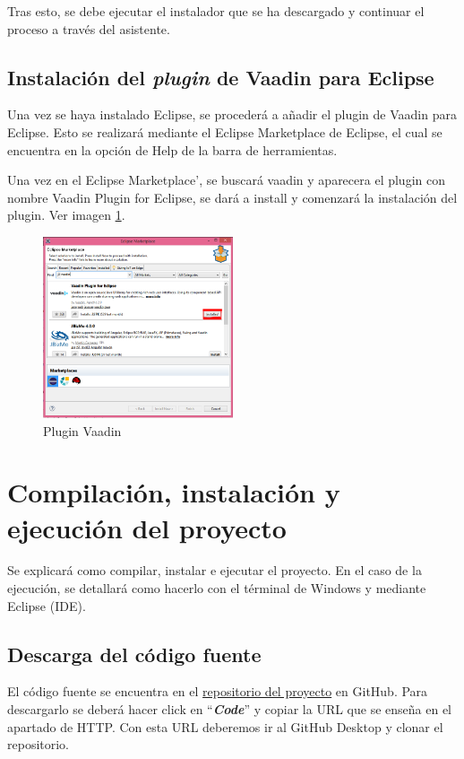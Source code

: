 Tras esto, se debe ejecutar el instalador que se ha descargado y continuar el proceso a través del asistente.

\subsection{Instalación del \textit{plugin} de Vaadin para Eclipse}
Una vez se haya instalado Eclipse, se procederá a añadir el plugin de Vaadin para Eclipse. 
Esto se realizará mediante el Eclipse Marketplace de Eclipse, el cual se encuentra en la opción de Help de la barra de herramientas. 

Una vez en el Eclipse Marketplace', se buscará vaadin y aparecera el plugin con nombre Vaadin Plugin for Eclipse, se dará a install y comenzará la instalación del plugin. Ver imagen \ref{img:Vaadin}.

\begin{figure}
\centering
\includegraphics[width=0.5\textwidth]{img/Plugin_Vaadin}
\caption{Plugin Vaadin}\label{img:Vaadin}
\end{figure}

\section{Compilación, instalación y ejecución del proyecto}
Se explicará como compilar, instalar e ejecutar el proyecto. En el caso de la ejecución, se detallará como hacerlo con el términal de Windows y mediante Eclipse (IDE).

\subsection{Descarga del código fuente}
El código fuente se encuentra en el \href{https://github.com/dbo1001/Gestor-TFG-2016}{repositorio del proyecto} en GitHub. Para descargarlo se deberá hacer click en ``\textbf{\textit{Code}}'' y copiar la URL que se enseña en el apartado de HTTP. Con esta URL deberemos ir al GitHub Desktop y clonar el repositorio.

